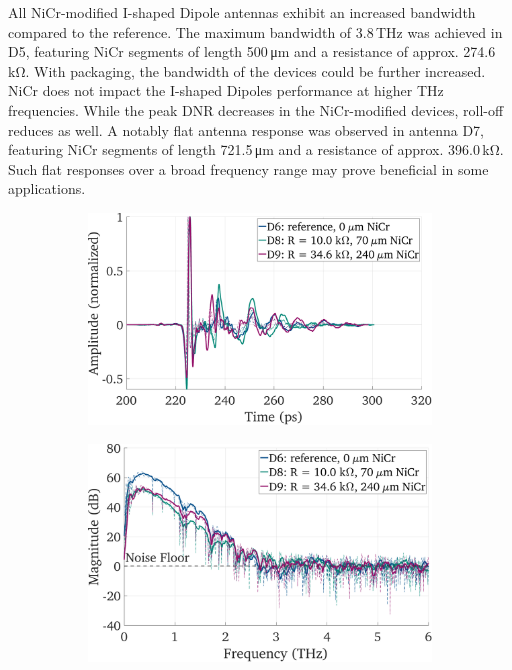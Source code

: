 All NiCr-modified I-shaped Dipole antennas exhibit an increased bandwidth compared to the reference. The maximum bandwidth of \num{3.8}\,\si{\tera \hertz} was achieved in D5, featuring NiCr segments of length \num{500}\,\si{\micro \meter} and a resistance of approx. \num{274.6}\,\si{\kilo \ohm}. With packaging, the bandwidth of the devices could be further increased. NiCr does not impact the I-shaped Dipoles performance at higher THz frequencies. While the peak DNR decreases in the NiCr-modified devices, roll-off reduces as well. A notably flat antenna response was observed in antenna D7, featuring NiCr segments of length \num{721.5}\,\si{\micro \meter} and a resistance of approx. \num{396.0}\,\si{\kilo \ohm}. Such flat responses over a broad frequency range may prove beneficial in some applications. 

\begin{figure}[!]
    \centering
    \begin{subfigure}[b]{0.49\textwidth}
        \centering
        \includegraphics[height=0.6\textwidth]{figures/Results/mainTextComp/D6_D8_D9/D6_D8_D9_MA_time_norm.pdf}
        \caption{\centering}
        \label{comp_d6_d8_d9_time}
    \end{subfigure}
    \hfill
    \begin{subfigure}[b]{0.49\textwidth}
        \centering
        \includegraphics[height=0.6\textwidth]{figures/Results/mainTextComp/D6_D8_D9/D6_D8_D9_spectrum.pdf}

\end{subfigure}
\end{figure}
